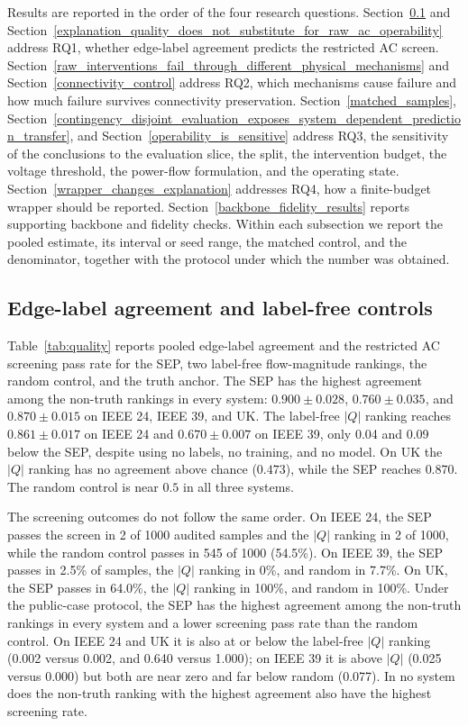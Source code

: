 Results are reported in the order of the four research questions. Section~\ref{edge_label_agreement_is_not_faithfulness} and Section~\ref{explanation_quality_does_not_substitute_for_raw_ac_operability} address RQ1, whether edge-label agreement predicts the restricted AC screen. Section~\ref{raw_interventions_fail_through_different_physical_mechanisms} and Section~\ref{connectivity_control} address RQ2, which mechanisms cause failure and how much failure survives connectivity preservation. Section~\ref{matched_samples}, Section~\ref{contingency_disjoint_evaluation_exposes_system_dependent_prediction_transfer}, and Section~\ref{operability_is_sensitive} address RQ3, the sensitivity of the conclusions to the evaluation slice, the split, the intervention budget, the voltage threshold, the power-flow formulation, and the operating state. Section~\ref{wrapper_changes_explanation} addresses RQ4, how a finite-budget wrapper should be reported. Section~\ref{backbone_fidelity_results} reports supporting backbone and fidelity checks. Within each subsection we report the pooled estimate, its interval or seed range, the matched control, and the denominator, together with the protocol under which the number was obtained.

\subsection{Edge-label agreement and label-free controls}\label{edge_label_agreement_is_not_faithfulness}

Table~\ref{tab:quality} reports pooled edge-label agreement and the restricted AC screening pass rate for the SEP, two label-free flow-magnitude rankings, the random control, and the truth anchor. The SEP has the highest agreement among the non-truth rankings in every system: $0.900\pm0.028$, $0.760\pm0.035$, and $0.870\pm0.015$ on IEEE 24, IEEE 39, and UK. The label-free $|Q|$ ranking reaches $0.861\pm0.017$ on IEEE 24 and $0.670\pm0.007$ on IEEE 39, only 0.04 and 0.09 below the SEP, despite using no labels, no training, and no model. On UK the $|Q|$ ranking has no agreement above chance ($0.473$), while the SEP reaches $0.870$. The random control is near $0.5$ in all three systems.

The screening outcomes do not follow the same order. On IEEE 24, the SEP passes the screen in 2 of 1000 audited samples and the $|Q|$ ranking in 2 of 1000, while the random control passes in 545 of 1000 (54.5\%). On IEEE 39, the SEP passes in 2.5\% of samples, the $|Q|$ ranking in 0\%, and random in 7.7\%. On UK, the SEP passes in 64.0\%, the $|Q|$ ranking in 100\%, and random in 100\%. Under the public-case protocol, the SEP has the highest agreement among the non-truth rankings in every system and a lower screening pass rate than the random control. On IEEE 24 and UK it is also at or below the label-free $|Q|$ ranking (0.002 versus 0.002, and 0.640 versus 1.000); on IEEE 39 it is above $|Q|$ (0.025 versus 0.000) but both are near zero and far below random (0.077). In no system does the non-truth ranking with the highest agreement also have the highest screening rate.

